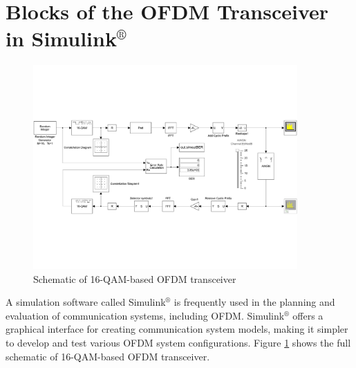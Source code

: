 \documentclass[11pt]{article}
\numberwithin{figure}{section}
\numberwithin{equation}{section}
\begin{document}
\section{Blocks of the OFDM Transceiver in Simulink$^\circledR$}
\begin{figure}[!h]
    \centering
    \includegraphics[width=0.9\textwidth]{images/simulink.pdf}
    \caption{Schematic of 16-QAM-based OFDM transceiver}
    \label{fig:simulink}
\end{figure}
A simulation software called Simulink$^\circledR$ is frequently used in the planning and evaluation of communication systems, including OFDM. Simulink$^\circledR$ offers a graphical interface for creating communication system models, making it simpler to develop and test various OFDM system configurations. Figure \ref{fig:simulink} shows the full schematic of 16-QAM-based OFDM transceiver.
\end{document}
